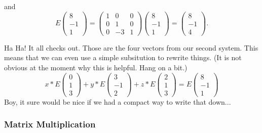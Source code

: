 \documentclass[10pt,]{book}
\theoremstyle{plain}
\theoremstyle{definition}
\numberwithin{equation}{section}
\begin{document}
        and
        \[
          E \begin{pmatrix} 8 \\ -1 \\ 1 \end{pmatrix} =
          \begin{pmatrix} 1 &0 &0 \\ 0 &1 &0 \\
          0 &-3 &1 \end{pmatrix} \begin{pmatrix} 8 \\ -1 \\ 1 \end{pmatrix}
          = \begin{pmatrix} 8 \\ -1 \\ 4 \end{pmatrix}.
        \]
\par

        Ha Ha! It all checks out. Those are the four vectors from our second
        system. This means that we can even use a simple subsitution to rewrite
        things. (It is not obvious at the moment why this is helpful. Hang on a
        bit.)
        \[
          x* E\begin{pmatrix} 0 \\ 1 \\ 3 \end{pmatrix} +
          y* E\begin{pmatrix} 3 \\ -1 \\ 2 \end{pmatrix} +
          z* E\begin{pmatrix} 2 \\ 1 \\ 3 \end{pmatrix} =
          E\begin{pmatrix} 8 \\ -1 \\ 1 \end{pmatrix}
        \]
        Boy, it sure would be nice if we had a compact way to write that down...
\typeout{************************************************}
\typeout{************************************************}
\subsubsection[Matrix Multiplication]{Matrix Multiplication}\label{subsubsection-15}
\end{document}
